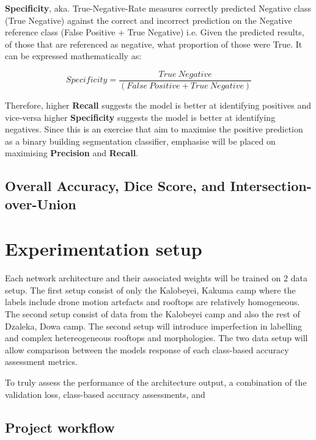\documentclass[11pt, a4paper, twoside]{report}
\begin{document}
\textbf{Specificity}, aka. True-Negative-Rate measures correctly predicted Negative class (True Negative) against the correct and incorrect prediction on the Negative reference class (False Positive + True Negative) i.e. Given the predicted results, of those that are referenced as negative, what proportion of those were True. It can be expressed mathematically as:

\begin{equation}
  Specificity = \frac{True\ Negative} {(False\ Positive + True\ Negative)}
\end{equation}

Therefore, higher \textbf{Recall} suggests the model is better at identifying positives and vice-versa higher \textbf{Specificity} suggests the model is better at identifying negatives. Since this is an exercise that aim to maximise the positive prediction as a binary building segmentation classifier, emphasise will be placed on maximising \textbf{Precision} and \textbf{Recall}.

\subsection{Overall Accuracy, Dice Score, and Intersection-over-Union}\label{2ndorder}
\section{Experimentation setup}\label{ExpSetup}

Each network architecture and their associated weights will be trained on 2 data setup. The first setup consist of only the Kalobeyei, Kakuma camp where the labels include drone motion artefacts and rooftops are relatively homogeneous. The second setup consist of data from the Kalobeyei camp and also the rest of Dzaleka, Dowa camp. The second setup will introduce imperfection in labelling and complex hetereogeneous rooftops and morphologies. The two data setup will allow comparison between the models response of each class-based accuracy assessment metrics.

To truly assess the performance of the architecture output, a combination of the validation loss, class-based accuracy assessments, and

\subsection{Project workflow}\label{ProjWorkflow}

\newpage
\end{document}
